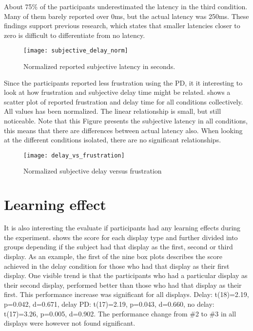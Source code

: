 About 75\% of the participants underestimated the latency in the third condition. Many of them barely reported over 0ms, but the actual latency was 250ms. These findings support previous research, which states that smaller latencies closer to zero is difficult to differentiate from no latency.

\begin{figure}[h!]
    \centering
    \texttt{[image: subjective\_delay\_norm]}
    \caption{Normalized reported subjective latency in seconds.}
    \label{subjective_delay_norm}
\end{figure}

\clearpage
Since the participants reported less frustration using the PD, it it interesting to look at how frustration and subjective delay time might be related.  shows a scatter plot of reported frustration and delay time for all conditions collectively. All values has been normalized. The linear relationship is small, but still noticeable. Note that this Figure presents the subjective latency in all conditions, this means that there are differences between actual latency also. When looking at the different conditions isolated, there are no significant relationships.

\begin{figure}[h!]
    \centering
    \texttt{[image: delay\_vs\_frustration]}
    \caption{Normalized subjective delay versus frustration}
    \label{delay_vs_frustration}
\end{figure}

\clearpage
\section{Learning effect}

It is also interesting the evaluate if participants had any learning effects during the experiment.  shows the score for each display type and further divided into groups depending if the subject had that display as the first, second or third display. As an example, the first of the nine box plots describes the score achieved in the delay condition for those who had that display as their first display. One visible trend is that the participants who had a particular display as their second display, performed better than those who had that display as their first. This performance increase was significant for all displays. Delay: t(18)=2.19, p=0.042, d=0.671, delay PD: t(17)=2.19, p=0.043, d=0.660, no delay: t(17)=3.26, p=0.005, d=0.902. The performance change from \#2 to \#3 in all displays were however not found significant.

